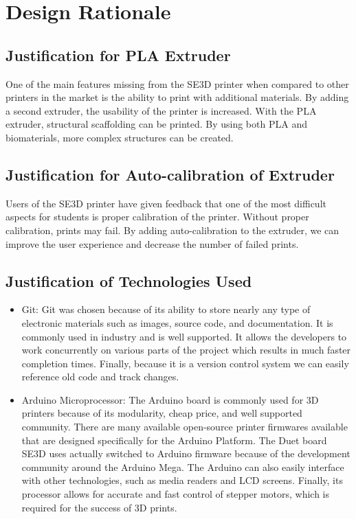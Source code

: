 \section{Design Rationale}

\subsection{Justification for PLA Extruder}
	One of the main features missing from the SE3D printer when compared to other printers in the market is the ability to print with additional materials. By adding a second extruder, the usability of the printer is increased. With the PLA extruder, structural scaffolding can be printed. By using both PLA and biomaterials, more complex structures can be created.

\subsection{Justification for Auto-calibration of Extruder }
	Users of the SE3D printer have given feedback that one of the most difficult aspects for students is proper calibration of the printer. Without proper calibration, prints may fail. By adding auto-calibration to the extruder, we can improve the user experience and decrease the number of failed prints.

\subsection{Justification of Technologies Used}
\begin{itemize}
\item Git: Git was chosen because of its ability to store nearly any type of electronic materials such as images, source code, and documentation. It is commonly used in industry and is well supported. It allows the developers to work concurrently on various parts of the project which results in much faster completion times. Finally, because it is a version control system we can easily reference old code and track changes.

\item Arduino Microprocessor: The Arduino board is commonly used for 3D printers because of its modularity, cheap price, and well supported community. There are many available open-source printer firmwares available that are designed specifically for the Arduino Platform. The Duet board SE3D uses actually switched to Arduino firmware because of the development community around the Arduino Mega. The Arduino can also easily interface with other technologies, such as media readers and LCD screens. Finally, its processor allows for accurate and fast control of stepper motors, which is required for the success of 3D prints.

\end{itemize}
